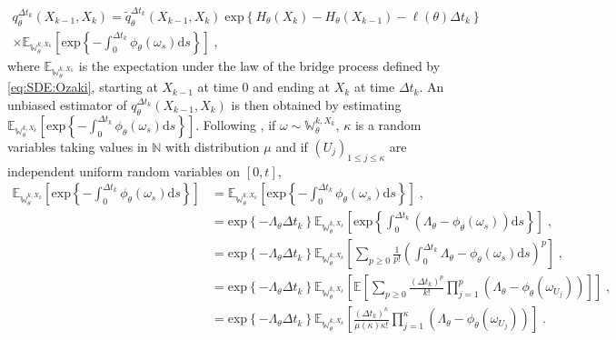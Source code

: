 \documentclass[12pt]{article}
\newcommand{\rmd}{\mathrm{d}}
\newcommand{\eqsp}{\;}
\newcommand{\1}{\mathrm{1}}
\begin{document}
\begin{multline*}
q^{\Delta t_k}_{\theta}(X_{k-1},X_k) = \widetilde{q}^{\Delta t_k}_{\theta}(X_{k-1},X_k) \eqsp\mathrm{exp}\left\{H_{\theta}(X_k) - H_{\theta}(X_{k-1})-\ell(\theta)\Delta t_k\right\}\\
\times\mathbb{E}_{\mathbb{W}_{\theta}^{k,X_{k}}}\left[\mathrm{exp}\left\{-\int_{0}^{\Delta t_k}\phi_{\theta}(\omega_s)\rmd s\right\}\right]\eqsp,
\end{multline*}
where $\mathbb{E}_{\mathbb{W}_{\theta}^{k,X_{k}}}$ is the expectation under the law of the bridge process defined by \eqref{eq:SDE:Ozaki}, starting at $X_{k-1}$ at time $0$ and ending at $X_{k}$ at time $\Delta t_k$.
An unbiased estimator of $q^{\Delta t_k}_{\theta}(X_{k-1},X_k)$ is then obtained by estimating $\mathbb{E}_{\mathbb{W}_{\theta}^{k,X_{k}}}\left[\mathrm{exp}\left\{-\int_{0}^{\Delta t_k}\phi_{\theta}(\omega_s)\rmd s\right\}\right]$. 
Following \cite{beskos:papaspiliopoulos:roberts:fearnhead:2006}, if $\omega \sim\mathbb{W}_{\theta}^{k,X_{k}}$, $\kappa$ is a random variables taking values in $\mathbb{N}$ with distribution $\mu$ and if $(U_j)_{1\le j\le \kappa}$ are independent uniform random variables on $[0,t]$, 
\begin{align*}
\mathbb{E}_{\mathbb{W}_{\theta}^{k,X_{k}}}\left[\mathrm{exp}\left\{-\int_{0}^{\Delta t_k}\phi_{\theta}(\omega_s)\rmd s\right\}\right] &= \mathbb{E}_{\mathbb{W}_{\theta}^{k,X_{k}}}\left[\mathrm{exp}\left\{-\int_{0}^{\Delta t_k}\phi_{\theta}(\omega_s)\rmd s\right\}\right]\eqsp,\\
&= \mathrm{exp}\left\{-\Lambda_{\theta}\Delta t_k\right\}\mathbb{E}_{\mathbb{W}_{\theta}^{k,X_{k}}}\left[\mathrm{exp}\left\{\int_{0}^{\Delta t_k}(\Lambda_{\theta}-\phi_{\theta}(\omega_s))\rmd s\right\}\right]\eqsp,\\
&=\mathrm{exp}\left\{-\Lambda_{\theta}\Delta t_k\right\}\mathbb{E}_{\mathbb{W}_{\theta}^{k,X_{k}}}\left[\sum_{p\ge 0}\frac{1}{p!}\left(\int_{0}^{\Delta t_k}\Lambda_{\theta}-\phi_{\theta}(\omega_s)\rmd s\right)^p\right]\eqsp,\\
&=\mathrm{exp}\left\{-\Lambda_{\theta}\Delta t_k\right\}\mathbb{E}_{\mathbb{W}_{\theta}^{k,X_{k}}}\left[\mathbb{E}\left[\sum_{p\ge 0}\frac{(\Delta t_k)^p}{k!}\prod_{j=1}^p\left(\Lambda_{\theta}-\phi_{\theta}(\omega_{U_j})\right)\right]\right]\eqsp,\\
&=\mathrm{exp}\left\{-\Lambda_{\theta}\Delta t_k\right\}\mathbb{E}_{\mathbb{W}_{\theta}^{k,X_{k}}}\left[\frac{(\Delta t_k)^{\kappa}}{\mu(\kappa)\kappa!}\prod_{j=1}^{\kappa}\left(\Lambda_{\theta}-\phi_{\theta}(\omega_{U_j})\right)\right]\eqsp.
\end{align*}
\end{document}
